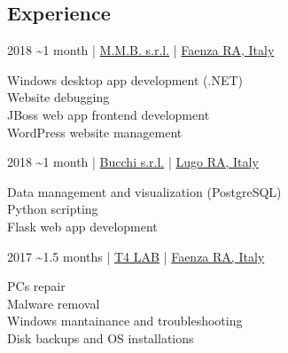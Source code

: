 \documentclass{article}
\begin{document}
\begin{paracol}{2}
%
%

\vfill

\section*{ Experience}

\begin{tcolorbox}[title=\emoji{man-technologist} Software Developer Internship,colback=white]
     2018 \textasciitilde 1 month \hfill | \hfill
    \href{https://www.mmbsoftware.it/portalemmb/en/home}{ M.M.B. s.r.l.} \hfill | \hfill
    \href{https://www.openstreetmap.org/node/1864397767}{ Faenza RA, Italy}

    \tcblower

     Windows desktop app development (.NET) \\[4pt]
     Website debugging \\[4pt]
     JBoss web app frontend development \\[4pt]
     WordPress website management
\end{tcolorbox}

\begin{tcolorbox}[title=\emoji{man-technologist} Software Developer Internship,colback=white]
     2018 \textasciitilde 1 month \hfill | \hfill
    \href{http://www.bucchi.it/en/}{ Bucchi s.r.l.} \hfill | \hfill
    \href{https://www.openstreetmap.org/node/4752486846}{ Lugo RA, Italy}

    \tcblower

     Data management and visualization (PostgreSQL) \\[4pt]
     Python scripting \\[4pt]
     Flask web app development
\end{tcolorbox}

\begin{tcolorbox}[title=\emoji{hammer-and-wrench} Computer Technician Internship,colback=white]
     2017 \textasciitilde 1.5 months \hfill | \hfill
    \href{https://www.t4lab.it/}{ T4 LAB} \hfill | \hfill
    \href{https://www.openstreetmap.org/node/4751590216}{ Faenza RA, Italy}

    \tcblower

     PCs repair \\[4pt]
     Malware removal \\[4pt]
     Windows mantainance and troubleshooting \\[4pt]
     Disk backups and OS installations
\end{tcolorbox}

\end{paracol}
\end{document}
